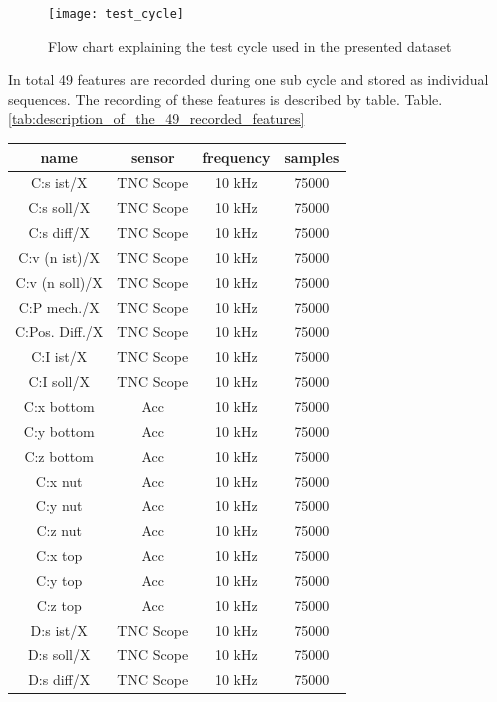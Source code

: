 \begin{figure}[htpb]
  \centering
  \texttt{[image: test\_cycle]}
  \caption {Flow chart explaining the test cycle used in the presented dataset}
  \label{fig:test_cycle}
\end{figure}

In total 49 features are recorded during one sub cycle and stored as individual sequences. The recording of these features is described by table. Table. \ref{tab:description_of_the_49_recorded_features}

\begin{center}
\begin{longtable}{||c c c c||} 
 \hline
 name & sensor & frequency & samples \\ [0.5ex] 
 \hline\hline
 C:s ist/X & TNC Scope & 10 kHz & 75000 \\ 
 \hline
 C:s soll/X & TNC Scope & 10 kHz & 75000 \\ 
 \hline
 C:s diff/X & TNC Scope & 10 kHz & 75000 \\ 
 \hline
 C:v (n ist)/X & TNC Scope & 10 kHz & 75000 \\ 
 \hline
 C:v (n soll)/X& TNC Scope & 10 kHz & 75000 \\ 
 \hline
 C:P mech./X & TNC Scope & 10 kHz & 75000 \\ 
 \hline
 C:Pos. Diff./X & TNC Scope & 10 kHz & 75000 \\ 
 \hline
 C:I ist/X & TNC Scope & 10 kHz & 75000 \\ 
  \hline
 C:I soll/X & TNC Scope & 10 kHz & 75000 \\ 
 \hline
 C:x bottom & Acc & 10 kHz & 75000 \\ 
 \hline
 C:y bottom & Acc & 10 kHz & 75000 \\ 
 \hline
 C:z bottom & Acc & 10 kHz & 75000 \\ 
 \hline
 C:x nut & Acc & 10 kHz & 75000 \\ 
 \hline
 C:y nut & Acc & 10 kHz & 75000 \\ 
 \hline
 C:z nut & Acc & 10 kHz & 75000 \\ 
 \hline
  C:x top & Acc & 10 kHz & 75000 \\ 
 \hline
 C:y top & Acc & 10 kHz & 75000 \\ 
 \hline
 C:z top & Acc & 10 kHz & 75000 \\ 
 \hline
 D:s ist/X & TNC Scope & 10 kHz & 75000 \\
  \hline
 D:s soll/X & TNC Scope & 10 kHz & 75000 \\ 
 \hline
 D:s diff/X & TNC Scope & 10 kHz & 75000 \\ 

\end{longtable}
\end{center}
